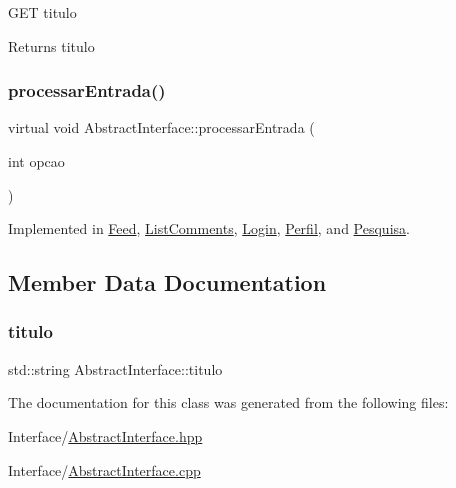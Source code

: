 G\+ET titulo \begin{DoxyReturn}{Returns}
titulo 
\end{DoxyReturn}
\mbox{\label{class_abstract_interface_acf8223a1da27c6986158836a57fa51ee}} 
\subsubsection{\texorpdfstring{processar\+Entrada()}{processarEntrada()}}
{\footnotesize\ttfamily virtual void Abstract\+Interface\+::processar\+Entrada (\begin{DoxyParamCaption}\item[{int}]{opcao }\end{DoxyParamCaption})\hspace{0.3cm}{\ttfamily [pure virtual]}}



Implemented in \hyperlink{class_feed_ac10ffff3edd9e5e9b51fd713bc055dff}{Feed}, \hyperlink{class_list_comments_a5f1742eb60e1fb9977bab791c3b8a672}{List\+Comments}, \hyperlink{class_login_ad32313d37b2ca70d7f8057c04ec12b0e}{Login}, \hyperlink{class_perfil_ad6a7cb27685c99b2660851819dc69b8f}{Perfil}, and \hyperlink{class_pesquisa_a15652da6caa4d4f41c86dc966168a789}{Pesquisa}.



\subsection{Member Data Documentation}
\mbox{\label{class_abstract_interface_ad3fcad6347738c58e5b9d092afb8a96e}} 
\subsubsection{\texorpdfstring{titulo}{titulo}}
{\footnotesize\ttfamily std\+::string Abstract\+Interface\+::titulo\hspace{0.3cm}{\ttfamily [private]}}



The documentation for this class was generated from the following files\+:\begin{DoxyCompactItemize}
\item 
Interface/\hyperlink{_abstract_interface_8hpp}{Abstract\+Interface.\+hpp}\item 
Interface/\hyperlink{_abstract_interface_8cpp}{Abstract\+Interface.\+cpp}\end{DoxyCompactItemize}
